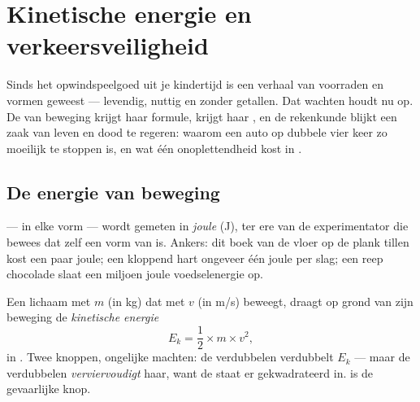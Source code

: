 \chapter{Kinetische energie en verkeersveiligheid}\label{ch:g9:kinetic-energy-safety}

Sinds het opwindspeelgoed uit je kindertijd is  een verhaal
van voorraden en vormen geweest --- levendig, nuttig en zonder
getallen. Dat wachten houdt nu op. De  van beweging
krijgt haar formule,  krijgt haar
, en de rekenkunde blijkt een zaak van leven en dood te
regeren: waarom een auto op dubbele  vier keer zo
moeilijk te stoppen is, en wat één  onoplettendheid kost in
.

\section{De energie van beweging}

\begin{definition}[De joule]\label{def:g9:kinetic-energy-safety:joule}
 --- in elke vorm --- wordt gemeten in
\emph{joule} (\unit{J}), ter ere van de experimentator die
bewees dat  zelf een vorm van  is.
Ankers: dit boek van de vloer op de plank tillen kost een paar joule;
een kloppend hart ongeveer één joule per slag; een reep chocolade slaat
een miljoen joule voedselenergie op.
\end{definition}

\begin{proposition}\label{prop:g9:kinetic-energy-safety:formula}
Een lichaam met  $m$ (in \unit{kg}) dat met
 $v$ (in \unit{m/s}) beweegt, draagt op grond van zijn
beweging de \emph{kinetische energie}
\[
E_k = \frac{1}{2} \times m \times v^2 ,
\]
in . Twee knoppen, ongelijke machten: de
 verdubbelen verdubbelt $E_k$ --- maar de
\emph{} verdubbelen \emph{verviervoudigt} haar, want de
 staat er gekwadrateerd in.
 is de gevaarlijke knop.
\end{proposition}

